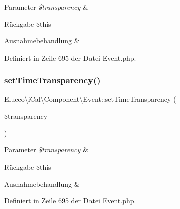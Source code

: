 \begin{DoxyParams}{Parameter}
{\em \$transparency} & \\
\hline
\end{DoxyParams}
\begin{DoxyReturn}{Rückgabe}
\$this
\end{DoxyReturn}

\begin{DoxyExceptions}{Ausnahmebehandlung}
{\em } & \\
\hline
\end{DoxyExceptions}


Definiert in Zeile 695 der Datei Event.\+php.

\mbox{\label{class_eluceo_1_1i_cal_1_1_component_1_1_event_a7387669529b87eb196b4aae53e3b2782}} 
\subsubsection{\texorpdfstring{set\+Time\+Transparency()}{setTimeTransparency()}\hspace{0.1cm}{\footnotesize\ttfamily [2/3]}}
{\footnotesize\ttfamily Eluceo\textbackslash{}i\+Cal\textbackslash{}\+Component\textbackslash{}\+Event\+::set\+Time\+Transparency (\begin{DoxyParamCaption}\item[{}]{\$transparency }\end{DoxyParamCaption})}


\begin{DoxyParams}{Parameter}
{\em \$transparency} & \\
\hline
\end{DoxyParams}
\begin{DoxyReturn}{Rückgabe}
\$this
\end{DoxyReturn}

\begin{DoxyExceptions}{Ausnahmebehandlung}
{\em } & \\
\hline
\end{DoxyExceptions}


Definiert in Zeile 695 der Datei Event.\+php.

\mbox{\label{class_eluceo_1_1i_cal_1_1_component_1_1_event_a7387669529b87eb196b4aae53e3b2782}} 
